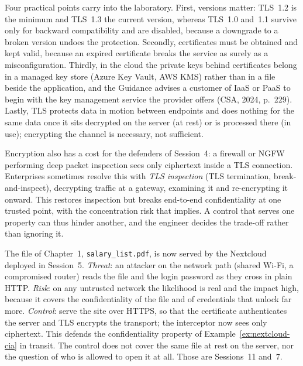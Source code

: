 Four practical points carry into the laboratory. First,
versions matter: TLS~1.2 is the minimum and TLS~1.3 the current version,
whereas TLS~1.0 and~1.1 survive only for backward compatibility and are
disabled, because a downgrade to a broken version undoes the protection.
Secondly, certificates must be obtained and kept valid, because an expired
certificate breaks the service as surely as a misconfiguration. Thirdly, in
the cloud the private keys behind certificates belong in a managed key store
(Azure Key Vault, AWS KMS) rather than in a file beside the application, and
the Guidance advises a customer of IaaS or PaaS to begin with the key
management service the provider offers (CSA, 2024, p.~229). Lastly, TLS
protects data in motion between endpoints and does nothing for the same data
once it sits decrypted on the server (at rest) or is processed there (in
use); encrypting the channel is necessary, not sufficient.

Encryption also has a cost for the defenders of Session~4: a firewall or
NGFW performing deep packet inspection sees only ciphertext inside a TLS
connection. Enterprises sometimes resolve this with \emph{TLS inspection}
(TLS termination, break-and-inspect), decrypting traffic at a gateway,
examining it and re-encrypting it onward. This restores inspection but
breaks end-to-end confidentiality at one trusted point, with the
concentration risk that implies. A control that serves one property can thus
hinder another, and the engineer decides the trade-off rather than ignoring
it.

\begin{example}\label{ex:tls-trc}
The file of Chapter~1, \texttt{salary\_list.pdf}, is now served by the
Nextcloud deployed in Session~5. \emph{Threat}: an attacker on the network
path (shared Wi-Fi, a compromised router) reads the file and the login
password as they cross in plain HTTP. \emph{Risk}: on any untrusted network
the likelihood is real and the impact high, because it covers the
confidentiality of the file and of credentials that unlock far more.
\emph{Control}: serve the site over HTTPS, so that the certificate
authenticates the server and TLS encrypts the transport; the interceptor now
sees only ciphertext. This defends the confidentiality property of
Example~\ref{ex:nextcloud-cia} in transit. The control does not cover the
same file at rest on the server, nor the question of who is allowed to open
it at all. Those are Sessions~11 and~7.
\end{example}


